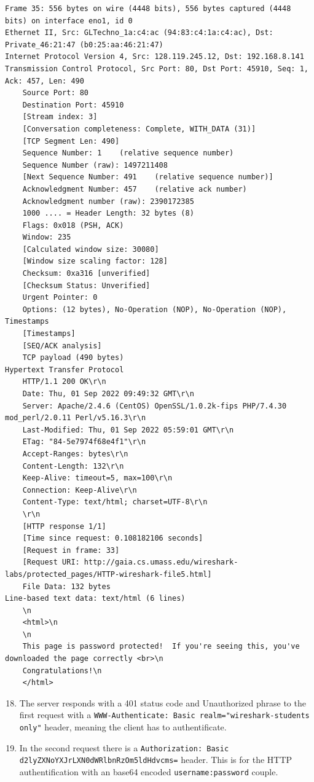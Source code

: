\documentclass[a4paper,11pt,final]{report}
\begin{document}
\begin{lstlisting}[breaklines]
Frame 35: 556 bytes on wire (4448 bits), 556 bytes captured (4448 bits) on interface eno1, id 0
Ethernet II, Src: GLTechno_1a:c4:ac (94:83:c4:1a:c4:ac), Dst: Private_46:21:47 (b0:25:aa:46:21:47)
Internet Protocol Version 4, Src: 128.119.245.12, Dst: 192.168.8.141
Transmission Control Protocol, Src Port: 80, Dst Port: 45910, Seq: 1, Ack: 457, Len: 490
    Source Port: 80
    Destination Port: 45910
    [Stream index: 3]
    [Conversation completeness: Complete, WITH_DATA (31)]
    [TCP Segment Len: 490]
    Sequence Number: 1    (relative sequence number)
    Sequence Number (raw): 1497211408
    [Next Sequence Number: 491    (relative sequence number)]
    Acknowledgment Number: 457    (relative ack number)
    Acknowledgment number (raw): 2390172385
    1000 .... = Header Length: 32 bytes (8)
    Flags: 0x018 (PSH, ACK)
    Window: 235
    [Calculated window size: 30080]
    [Window size scaling factor: 128]
    Checksum: 0xa316 [unverified]
    [Checksum Status: Unverified]
    Urgent Pointer: 0
    Options: (12 bytes), No-Operation (NOP), No-Operation (NOP), Timestamps
    [Timestamps]
    [SEQ/ACK analysis]
    TCP payload (490 bytes)
Hypertext Transfer Protocol
    HTTP/1.1 200 OK\r\n
    Date: Thu, 01 Sep 2022 09:49:32 GMT\r\n
    Server: Apache/2.4.6 (CentOS) OpenSSL/1.0.2k-fips PHP/7.4.30 mod_perl/2.0.11 Perl/v5.16.3\r\n
    Last-Modified: Thu, 01 Sep 2022 05:59:01 GMT\r\n
    ETag: "84-5e7974f68e4f1"\r\n
    Accept-Ranges: bytes\r\n
    Content-Length: 132\r\n
    Keep-Alive: timeout=5, max=100\r\n
    Connection: Keep-Alive\r\n
    Content-Type: text/html; charset=UTF-8\r\n
    \r\n
    [HTTP response 1/1]
    [Time since request: 0.108182106 seconds]
    [Request in frame: 33]
    [Request URI: http://gaia.cs.umass.edu/wireshark-labs/protected_pages/HTTP-wireshark-file5.html]
    File Data: 132 bytes
Line-based text data: text/html (6 lines)
    \n
    <html>\n
    \n
    This page is password protected!  If you're seeing this, you've downloaded the page correctly <br>\n
    Congratulations!\n
    </html>
\end{lstlisting}

\begin{enumerate}
\setcounter{enumi}{17}
\item The server responds with a 401 status code and Unauthorized phrase to the first request with a \texttt{WWW-Authenticate: Basic realm="wireshark-students only"} header, meaning the client has to authentificate.
\item In the second request there is a \texttt{Authorization: Basic d2lyZXNoYXJrLXN0dWRlbnRzOm5ldHdvcms=} header. This is for the HTTP authentification with an base64 encoded \texttt{username:password} couple.
\end{enumerate}
\end{document}
